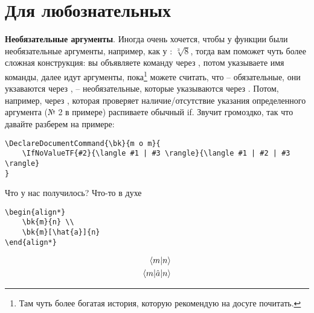 \section*{Для любознательных}


\textbf{Необязательные аргументы}.
Иногда очень хочется, чтобы у функции были необязательные аргументы, например, как у : $\sqrt[3]{8}$,
тогда вам поможет чуть более сложная конструкция: вы объявляете команду через , потом указываете имя команды, далее идут аргументы, пока\footnote{
    Там чуть более богатая история, которую рекомендую на досуге почитать.
}  можете считать, что  -- обязательные, они укзаваются через ,  -- необязательные, которые указываются через \codeword{[...]}. Потом, например, через , которая проверяет наличие/отсутствие указания определенного аргумента (№ 2 в примере) распиваете обычный if. Звучит громоздко, так что давайте разберем на примере:
\begin{lstlisting}
\DeclareDocumentCommand{\bk}{m o m}{
    \IfNoValueTF{#2}{\langle #1 | #3 \rangle}{\langle #1 | #2 | #3 \rangle}
}
\end{lstlisting}
Что у нас получилось? Что-то в духе \\
\begin{minipage}{0.45\textwidth}
    \begin{lstlisting}
\begin{align*}
    \bk{m}{n} \\
    \bk{m}[\hat{a}]{n}
\end{align*}
\end{lstlisting}
\end{minipage}
\hfill
\vline
\hfill
\begin{minipage}{0.45\textwidth}
\begin{align*}
    \bk{m}{n} \\
    \bk{m}[\hat{a}]{n}
\end{align*}
\end{minipage}


